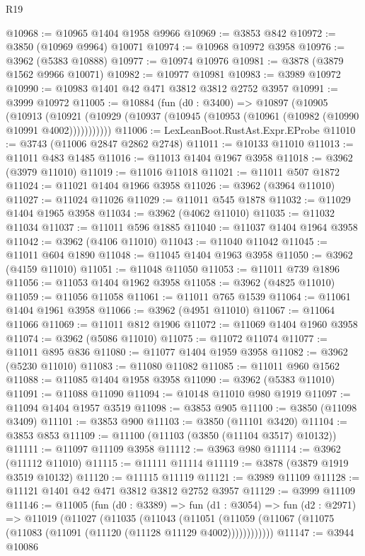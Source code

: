 \begin{lexlean}{R19}
\begin{coremodule}
@10968 := @10965 @1404 @1958 @9966
@10969 := @3853 @842
@10972 := @3850 (@10969 @9964) @10071
@10974 := @10968 @10972 @3958
@10976 := @3962 (@5383 @10888)
@10977 := @10974 @10976
@10981 := @3878 (@3879 @1562 @9966 @10071)
@10982 := @10977 @10981
@10983 := @3989 @10972
@10990 := @10983 @1401 @42 @471 @3812 @3812 @2752 @3957
@10991 := @3999 @10972
@11005 := @10884
    (fun (d0 : @3400) =>
    @10897
      (@10905
        (@10913
          (@10921 (@10929 (@10937 (@10945 (@10953 (@10961 (@10982 (@10990 @10991 @4002)))))))))))
@11006 := LexLeanBoot.RustAst.Expr.EProbe
@11010 := @3743 (@11006 @2847 @2862 @2748)
@11011 := @10133 @11010
@11013 := @11011 @483 @1485
@11016 := @11013 @1404 @1967 @3958
@11018 := @3962 (@3979 @11010)
@11019 := @11016 @11018
@11021 := @11011 @507 @1872
@11024 := @11021 @1404 @1966 @3958
@11026 := @3962 (@3964 @11010)
@11027 := @11024 @11026
@11029 := @11011 @545 @1878
@11032 := @11029 @1404 @1965 @3958
@11034 := @3962 (@4062 @11010)
@11035 := @11032 @11034
@11037 := @11011 @596 @1885
@11040 := @11037 @1404 @1964 @3958
@11042 := @3962 (@4106 @11010)
@11043 := @11040 @11042
@11045 := @11011 @604 @1890
@11048 := @11045 @1404 @1963 @3958
@11050 := @3962 (@4159 @11010)
@11051 := @11048 @11050
@11053 := @11011 @739 @1896
@11056 := @11053 @1404 @1962 @3958
@11058 := @3962 (@4825 @11010)
@11059 := @11056 @11058
@11061 := @11011 @765 @1539
@11064 := @11061 @1404 @1961 @3958
@11066 := @3962 (@4951 @11010)
@11067 := @11064 @11066
@11069 := @11011 @812 @1906
@11072 := @11069 @1404 @1960 @3958
@11074 := @3962 (@5086 @11010)
@11075 := @11072 @11074
@11077 := @11011 @895 @836
@11080 := @11077 @1404 @1959 @3958
@11082 := @3962 (@5230 @11010)
@11083 := @11080 @11082
@11085 := @11011 @960 @1562
@11088 := @11085 @1404 @1958 @3958
@11090 := @3962 (@5383 @11010)
@11091 := @11088 @11090
@11094 := @10148 @11010 @980 @1919
@11097 := @11094 @1404 @1957 @3519
@11098 := @3853 @905
@11100 := @3850 (@11098 @3409)
@11101 := @3853 @900
@11103 := @3850 (@11101 @3420)
@11104 := @3853 @853
@11109 := @11100 (@11103 (@3850 (@11104 @3517) @10132))
@11111 := @11097 @11109 @3958
@11112 := @3963 @980
@11114 := @3962 (@11112 @11010)
@11115 := @11111 @11114
@11119 := @3878 (@3879 @1919 @3519 @10132)
@11120 := @11115 @11119
@11121 := @3989 @11109
@11128 := @11121 @1401 @42 @471 @3812 @3812 @2752 @3957
@11129 := @3999 @11109
@11146 := @11005
    (fun (d0 : @3389) =>
    fun (d1 : @3054) =>
    fun (d2 : @2971) =>
    @11019
      (@11027
        (@11035
          (@11043
            (@11051 (@11059 (@11067 (@11075 (@11083 (@11091 (@11120 (@11128 @11129 @4002))))))))))))
@11147 := @3944 @10086

\end{coremodule}
\end{lexlean}
